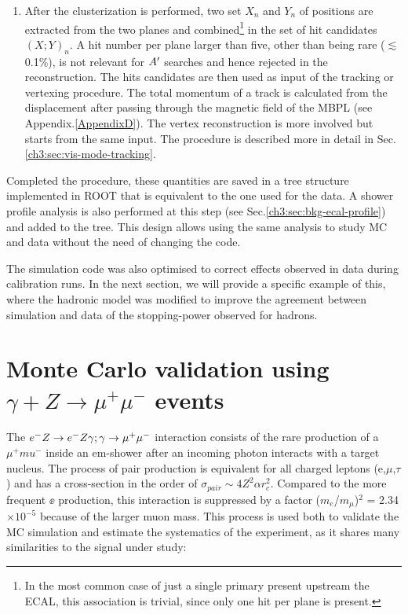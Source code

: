 \begin{enumerate}
\item After the clusterization is performed, two set $X_n$ and $Y_n$ of positions are extracted from the two planes and combined\footnote{In the most common case of just a single primary present upstream the ECAL, this association is trivial, since only one hit per plane is present.} in the set of hit candidates $(X;Y)_n$. A hit number per plane larger than five, other than being rare ($\lesssim$0.1\%), is not relevant for $A'$ searches and hence rejected in the reconstruction. The hits candidates are then used as input of the tracking or vertexing procedure. The total momentum of a track is calculated from the displacement after passing through the magnetic field of the MBPL (see Appendix.\ref{AppendixD}). The vertex reconstruction is more involved but starts from the same input. The procedure is described more in detail in Sec.\ref{ch3:sec:vis-mode-tracking}.
\end{enumerate}

Completed the procedure, these quantities are saved in a tree structure implemented in ROOT \cite{root} that is equivalent to the one used for the data. A shower profile analysis is also performed at this step (see Sec.\ref{ch3:sec:bkg-ecal-profile}) and added to the tree. This design allows using the same analysis to study MC and data without the need of changing the code.

The simulation code was also optimised to correct effects observed in data during calibration runs. In the next section, we will provide a specific example of this, where the hadronic model was modified to improve the agreement between simulation and data of the stopping-power observed for hadrons.

\section{Monte Carlo validation using $\gamma + Z \rightarrow \mu^+ \mu^-$ events}
\label{ch3:sec:dimuons}

The $e^- Z \to e^- Z \gamma; \gamma \to \mu^+ \mu^-$ interaction consists of the rare production of a $\mu^+mu^-$ inside an em-shower after an incoming photon interacts with a target nucleus. The process of pair production is equivalent for all charged leptons (e,$\mu$,$\tau$) and has a cross-section in the order of $\sigma_{pair} \sim 4Z^2\alpha r^2_c$. Compared to the more frequent $\ee$ production, this interaction is suppressed by a factor ($m_e$/$m_{\mu}$)$^2$ = 2.34 $\times 10^{-5}$ because of the larger muon mass. This process is used both to validate the MC simulation and estimate the systematics of the experiment, as it shares many similarities to the signal under study:


